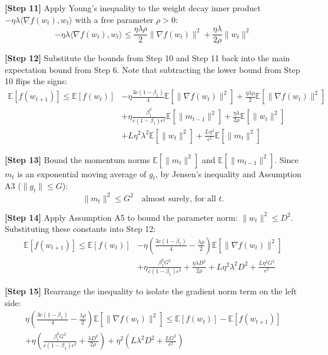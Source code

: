 \documentclass[11pt]{article}
\begin{document}
\textbf{[Step 11]} Apply Young's inequality to the weight decay inner product $-\eta \lambda \langle \nabla f(w_t), w_t \rangle$ with a free parameter $\rho > 0$:
\begin{equation}
    -\eta \lambda \langle \nabla f(w_t), w_t \rangle \leq \frac{\eta \lambda \rho}{2} \|\nabla f(w_t)\|^2 + \frac{\eta \lambda}{2\rho} \|w_t\|^2
\end{equation}

\textbf{[Step 12]} Substitute the bounds from Step 10 and Step 11 back into the main expectation bound from Step 6. Note that subtracting the lower bound from Step 10 flips the signs:
\begin{align}
    \mathbb{E}[f(w_{t+1})] \leq \mathbb{E}[f(w_t)] &- \eta \frac{3c(1-\beta_1)}{4} \mathbb{E}[\|\nabla f(w_t)\|^2] + \frac{\eta \lambda \rho}{2} \mathbb{E}[\|\nabla f(w_t)\|^2] \nonumber \\
    &+ \eta \frac{\beta_1^2}{c(1-\beta_1)\epsilon^2} \mathbb{E}[\|m_{t-1}\|^2] + \frac{\eta \lambda}{2\rho} \mathbb{E}[\|w_t\|^2] \nonumber \\
    &+ L \eta^2 \lambda^2 \mathbb{E}[\|w_t\|^2] + \frac{L \eta^2}{\epsilon^2} \mathbb{E}[\|m_t\|^2]
\end{align}

\textbf{[Step 13]} Bound the momentum norms $\mathbb{E}[\|m_t\|^2]$ and $\mathbb{E}[\|m_{t-1}\|^2]$. Since $m_t$ is an exponential moving average of $g_t$, by Jensen's inequality and Assumption A3 ($\|g_t\| \leq G$):
\begin{equation}
    \|m_t\|^2 \leq G^2 \quad \text{almost surely, for all } t.
\end{equation}

\textbf{[Step 14]} Apply Assumption A5 to bound the parameter norm: $\|w_t\|^2 \leq D^2$. Substituting these constants into Step 12:
\begin{align}
    \mathbb{E}[f(w_{t+1})] \leq \mathbb{E}[f(w_t)] &- \eta \left( \frac{3c(1-\beta_1)}{4} - \frac{\lambda \rho}{2} \right) \mathbb{E}[\|\nabla f(w_t)\|^2] \nonumber \\
    &+ \eta \frac{\beta_1^2 G^2}{c(1-\beta_1)\epsilon^2} + \frac{\eta \lambda D^2}{2\rho} + L \eta^2 \lambda^2 D^2 + \frac{L \eta^2 G^2}{\epsilon^2}
\end{align}

\textbf{[Step 15]} Rearrange the inequality to isolate the gradient norm term on the left side:
\begin{align}
    \eta \left( \frac{3c(1-\beta_1)}{4} - \frac{\lambda \rho}{2} \right) \mathbb{E}[\|\nabla f(w_t)\|^2] \leq \mathbb{E}[f(w_t)] - \mathbb{E}[f(w_{t+1})] \nonumber \\
    + \eta \left( \frac{\beta_1^2 G^2}{c(1-\beta_1)\epsilon^2} + \frac{\lambda D^2}{2\rho} \right) + \eta^2 \left( L \lambda^2 D^2 + \frac{L G^2}{\epsilon^2} \right)
\end{align}
\end{document}
